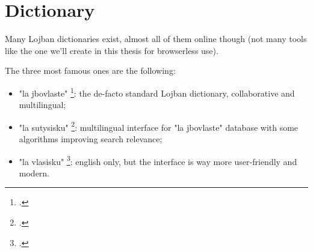 \section{Dictionary}
\label{sec:dictionary}

Many Lojban dictionaries exist, almost all of them online though (not many tools like the one we'll create
in this thesis for browserless use).\newline

The three most famous ones are the following:

\begin{itemize}
\item "la jbovlaste" \footcite{jbovlaste}: the de-facto standard Lojban dictionary, collaborative and multilingual;
\item "la sutysisku" \footcite{sutysisku}: multilingual interface for "la jbovlaste" database with some algorithms improving search relevance;
\item "la vlasisku" \footcite{vlasisku}: english only, but the interface is way more user-friendly and modern.
\end{itemize}